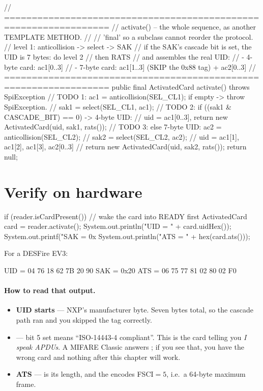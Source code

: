 \begin{jcode}
    // =================================================================
    // activate() -- the whole sequence, as another TEMPLATE METHOD.
    //
    // 'final' so a subclass cannot reorder the protocol.
    //   level 1: anticollision -> select -> SAK
    //   if the SAK's cascade bit is set, the UID is 7 bytes: do level 2
    //   then RATS
    // and assembles the real UID:
    //   - 4-byte card: ac1[0..3]
    //   - 7-byte card: ac1[1..3]  (SKIP the 0x88 tag)  +  ac2[0..3]
    // =================================================================
    public final ActivatedCard activate() throws SpiException {
        // TODO 1: ac1 = anticollision(SEL_CL1); if empty -> throw SpiException.
        //         sak1 = select(SEL_CL1, ac1);
        // TODO 2: if ((sak1 & CASCADE_BIT) == 0) -> 4-byte UID:
        //         uid = ac1[0..3], return new ActivatedCard(uid, sak1, rats());
        // TODO 3: else 7-byte UID: ac2 = anticollision(SEL_CL2);
        //         sak2 = select(SEL_CL2, ac2);
        //         uid = { ac1[1], ac1[2], ac1[3], ac2[0..3] }
        //         return new ActivatedCard(uid, sak2, rats());
        return null;
    }
\end{jcode}

\section{Verify on hardware}

\begin{jcode}
if (reader.isCardPresent()) {              // wake the card into READY first
    ActivatedCard card = reader.activate();
    System.out.println("UID  = " + card.uidHex());
    System.out.printf("SAK  = 0x%
    System.out.println("ATS  = " + hex(card.ats()));
}
\end{jcode}

\begin{verifybox}
For a DESFire EV3:
\begin{trace}
UID  = 04 76 18 62 7B 20 90
SAK  = 0x20
ATS  = 06 75 77 81 02 80 02 F0
\end{trace}
\end{verifybox}

\paragraph{How to read that output.}

\begin{itemize}
  \item \textbf{UID starts } --- NXP's manufacturer byte. Seven bytes
        total, so the cascade path ran and you skipped the tag correctly.
  \item \textbf{} --- bit 5 set means ``ISO-14443-4
        compliant''. This is the card telling you \emph{I speak APDUs}. A MIFARE
        Classic answers ; if you see that, you have the wrong card and
        nothing after this chapter will work.
  \item \textbf{ATS} ---  is its length, and the  encodes
        FSCI${}=5$, i.e.\ a 64-byte maximum frame.
\end{itemize}

